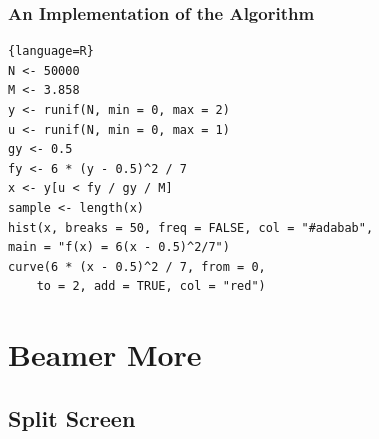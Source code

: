 \begin{frame}[fragile]
    \frametitle{{An Implementation of the Algorithm}}
    \begin{minipage}{\linewidth}
        \begin{lstlisting}{language=R}
N <- 50000
M <- 3.858
y <- runif(N, min = 0, max = 2)
u <- runif(N, min = 0, max = 1)
gy <- 0.5
fy <- 6 * (y - 0.5)^2 / 7
x <- y[u < fy / gy / M]
sample <- length(x)
hist(x, breaks = 50, freq = FALSE, col = "#adabab",
main = "f(x) = 6(x - 0.5)^2/7")
curve(6 * (x - 0.5)^2 / 7, from = 0, 
    to = 2, add = TRUE, col = "red")
    \end{lstlisting}
    \end{minipage}

\end{frame}

\section{Beamer More}

\subsection{Split Screen}

